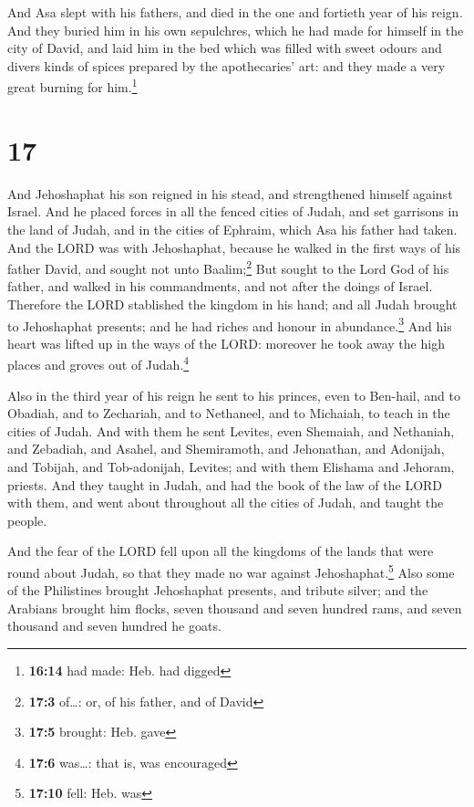 And Asa slept with his fathers, and died in the one and
fortieth year of his reign.  And they buried him in his
own sepulchres, which he had made for himself in the city of David, and
laid him in the bed which was filled with sweet odours and divers kinds
of spices prepared by the apothecaries' art: and they made a very great
burning for him.\footnote{\textbf{16:14} had made: Heb. had digged}

\hypertarget{section-16}{%
\section{17}\label{section-16}}

 And Jehoshaphat his son reigned in his stead, and
strengthened himself against Israel.  And he placed forces
in all the fenced cities of Judah, and set garrisons in the land of
Judah, and in the cities of Ephraim, which Asa his father had taken.
 And the LORD was with Jehoshaphat, because he walked in
the first ways of his father David, and sought not unto
Baalim;\footnote{\textbf{17:3} of\ldots: or, of his father, and of David}
 But sought to the Lord God of his father, and walked in
his commandments, and not after the doings of Israel. 
Therefore the LORD stablished the kingdom in his hand; and all Judah
brought to Jehoshaphat presents; and he had riches and honour in
abundance.\footnote{\textbf{17:5} brought: Heb. gave}  And
his heart was lifted up in the ways of the LORD: moreover he took away
the high places and groves out of Judah.\footnote{\textbf{17:6}
  was\ldots: that is, was encouraged}

 Also in the third year of his reign he sent to his
princes, even to Ben-hail, and to Obadiah, and to Zechariah, and to
Nethaneel, and to Michaiah, to teach in the cities of Judah.
 And with them he sent Levites, even Shemaiah, and
Nethaniah, and Zebadiah, and Asahel, and Shemiramoth, and Jehonathan,
and Adonijah, and Tobijah, and Tob-adonijah, Levites; and with them
Elishama and Jehoram, priests.  And they taught in Judah,
and had the book of the law of the LORD with them, and went about
throughout all the cities of Judah, and taught the people.

 And the fear of the LORD fell upon all the kingdoms of
the lands that were round about Judah, so that they made no war against
Jehoshaphat.\footnote{\textbf{17:10} fell: Heb. was} 
Also some of the Philistines brought Jehoshaphat presents, and tribute
silver; and the Arabians brought him flocks, seven thousand and seven
hundred rams, and seven thousand and seven hundred he goats.

